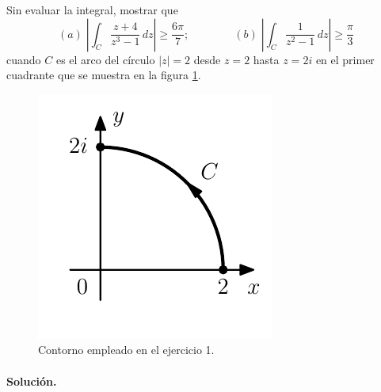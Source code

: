 \documentclass[a4paper]{report}
\begin{document}
Sin evaluar la integral, mostrar que 
\[
 (\textit{a})\;\left|\int_C\frac{z+4}{z^3-1}\,dz\right|\geq\frac{6\pi}{7};\qquad\qquad (\textit{b})\;\left|\int_C\frac{1}{z^2-1}\,dz\right|\geq\frac{\pi}{3}
\]
cuando \(C\) es el arco del círculo \(|z|=2\) desde \(z=2\) hasta \(z=2i\) en el primer cuadrante que se muestra en la figura \ref{fig:exercise_47_01}.
\begin{figure}[!htb]
 \begin{minipage}[c]{0.24\textwidth}
  \includegraphics[width=\textwidth]{figuras/exercise_47_01.pdf}
 \end{minipage}\hfill
 \begin{minipage}[c]{0.66\textwidth}
  \caption{
    Contorno empleado en el ejercicio 1.
    }\label{fig:exercise_47_01}
 \end{minipage}
\end{figure}

\paragraph{Solución.} 
\end{document}
